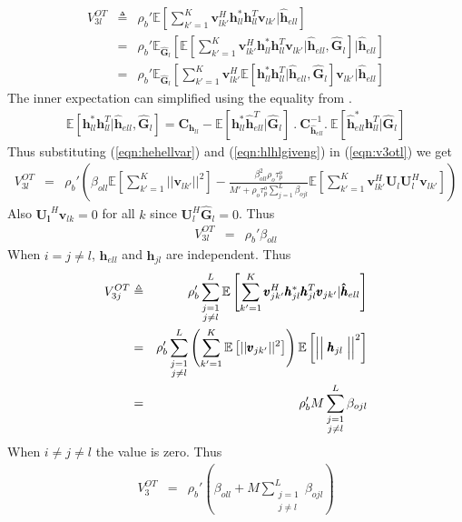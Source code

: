 \documentclass[10pt, a4paper, twoside,fleqn]{article}
\begin{document}
\begin{eqnarray}\label{eqn:v3otl}
     V_{3l}^{OT} &\triangleq& \rho_b' \mathbb{E}\left[\sum_{k'=1}^{K} \pmb{v}_{lk'}^H \pmb{h}_{ll}^*  \pmb{h}_{ll}^T\pmb{v}_{lk'}| \pmb{\hat h}_{ell} \right] \nonumber \\
            &=& \rho_b' \mathbb{E}_{\pmb{\widehat{G}}_l}\left[\mathbb{E}\left[\sum_{k'=1}^{K} \pmb{v}^H_{lk'} \pmb{h}_{ll}^* \pmb{h}_{ll}^T \pmb{v}_{lk'}| \pmb{\hat h}_{ell},  \pmb{\widehat{G}}_{l} \right] | \pmb{\hat h}_{ell}\right] \nonumber \\
            &=& \rho_b' \mathbb{E}_{\pmb{\widehat{G}}_l}\left[\sum_{k'=1}^{K}\pmb{v}^H_{lk'} \mathbb{E}\left[ \pmb{h}_{ll}^*  \pmb{h}^T_{ll} | \pmb{\hat h}_{ell},  \pmb{\widehat{G}}_{l} \right] \pmb{v}_{lk'}| \pmb{\hat h}_{ell}\right]
\end{eqnarray}
The inner expectation can simplified using the equality from \cite{bib:rmtBook}.
\begin{eqnarray}\label{eqn:hlhlgiveng}
	\mathbb{E}[\pmb{h}_{ll}^*\pmb{h}^T_{ll}|\pmb{\hat h}_{ell}, \pmb{\widehat{G}}_{l}] = \pmb{C}_{\pmb{h}_{ll}}-\mathbb{E}[\pmb{h}_{ll}^* \pmb{\hat h}^T_{ell}| \pmb{\widehat{G}}_{l}] \ . \ \pmb{C}_{\pmb{\hat h}_{ell}}^{-1} .\ \mathbb{E}[\pmb{\hat h}_{ell}^* \pmb{h}_{ll}^T| \pmb{\widehat{G}}_{l}]
\end{eqnarray}
Thus substituting (\ref{eqn:hehellvar}) and (\ref{eqn:hlhlgiveng}) in (\ref{eqn:v3otl}) we get
\begin{eqnarray}\label{eqn:otv3}
	V_{3l}^{OT} &=& \rho_b'\left( \beta_{oll} \mathbb{E}\left[\sum_{k'=1}^{K}||\pmb{v}_{lk'}||^2\right]
					- \frac{\beta_{oll}^{2}\rho_o\tau_p^o}{M'+\rho_o\tau_p^o\sum\limits_{j=1}^{L}\beta_{ojl}} \mathbb{E}\left[\sum_{k'=1}^{K} \pmb{v}_{lk'}^H \pmb{U}_l \pmb{U}_l^H \pmb{v}_{lk'}\right]\right)
\end{eqnarray}
Also $\pmb{U_l}^H\pmb{v}_{lk}=0$ for all $k$ since $\pmb{U}_l^H\pmb{\widehat{G}}_l=0$. Thus
\begin{eqnarray}
       	V_{3l}^{OT} &=& \rho_b'\beta_{oll}
\end{eqnarray}
When $i=j\neq l$, $\pmb{\hat h}_{ell}$ and $\pmb{h}_{jl}$ are independent. Thus
\begin{eqnarray}\label{eqn:v3jot}
V_{3j}^{OT} &\triangleq& \rho_b' \sum_{\substack{j=1 \\ j\neq l}}^{L} \mathbb{E}\left[\sum_{k'=1}^{K} \pmb{v}_{jk'}^H \pmb{h}_{jl}^*  \pmb{h}_{jl}^T \pmb{v}_{jk'}| \pmb{\hat h}_{ell} \right] \nonumber \\
           &=&  \rho_b' \sum_{\substack{j=1 \\ j\neq l}}^{L}\left(\sum_{k'=1}^{K} \mathbb{E}\left[||\pmb{v}_{jk'}||^2\right]\right)\mathbb{E}\left[ \Bigm|\Bigm|\pmb{h}_{jl}\Bigm|\Bigm|^2\right] \nonumber \\
           &=&\rho_b'M \sum_{\substack{j=1 \\ j\neq l}}^{L}\beta_{ojl}
\end{eqnarray}
When $i\neq j\neq l$ the value is zero. Thus
\begin{eqnarray}
V_3^{OT} &=&\rho_b' \left(\beta_{oll}+ M \sum_{\substack{j=1 \\ j\neq l}}^{L}\beta_{ojl}\right)
\end{eqnarray}
\end{document}
